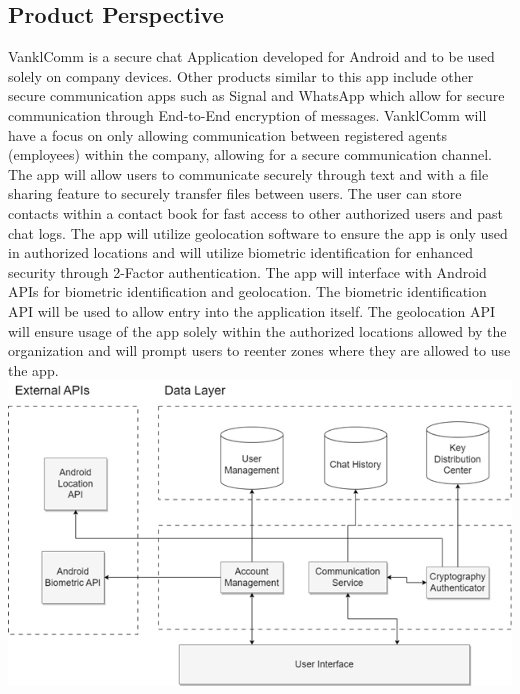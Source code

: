 \documentclass[]{article}
\begin{document}
\subsection{Product Perspective}
\label{sub:product_perspective}
VanklComm is a secure chat Application developed for Android and to be used solely on company devices. Other products similar to this app include other secure communication apps such as Signal and WhatsApp which allow for secure communication through End-to-End encryption of messages. VanklComm will have a focus on only allowing communication between registered agents (employees) within the company, allowing for a secure communication channel. The app will allow users to communicate securely through text and with a file sharing feature to securely transfer files between users. The user can store contacts within a contact book for fast access to other authorized users and past chat logs. The app will utilize geolocation software to ensure the app is only used in authorized locations and will utilize biometric identification for enhanced security through 2-Factor authentication.
\newline
\newline
The app will interface with Android APIs for biometric identification and geolocation. The biometric identification API will be used to allow entry into the application itself. The geolocation API will ensure usage of the app solely within the authorized locations allowed by the organization and will prompt users to reenter zones where they are allowed to use the app.
\newline
\includegraphics{blockdiagram.png}
\end{document}
